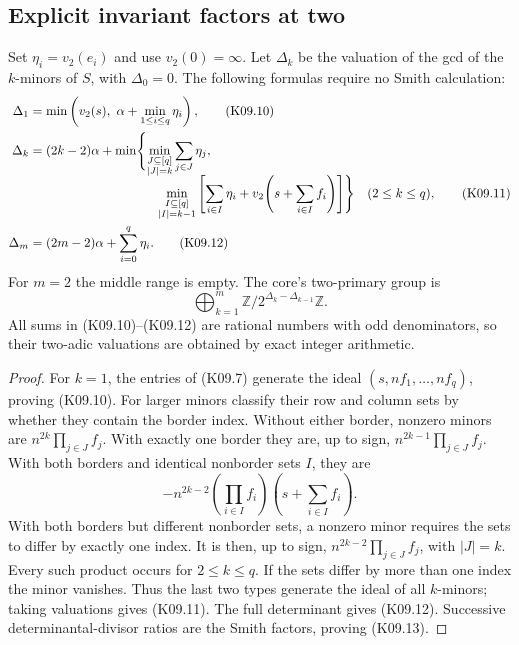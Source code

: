 \documentclass[11pt,a4paper]{article}
\theoremstyle{definition}\newtheorem{definition}[theorem]{Definition}
\theoremstyle{remark}\newtheorem{remark}[theorem]{Remark}
\newcommand{\Z}{\mathbb Z}\newcommand{\Q}{\mathbb Q}\newcommand{\F}{\mathbb F}
\numberwithin{equation}{section}
\begin{document}
\subsection{Explicit invariant factors at two}\label{K09-sec-4}
Set $\eta_i=v_2(e_i)$ and use $v_2(0)=\infty$. Let $\Delta_k$ be the valuation of the gcd of the $k$-minors of $S$, with $\Delta_0=0$. The following formulas require no Smith calculation:
\begin{align*}
 \Delta_1&=\min\left(v_2(s),\ \alpha+\min_{1\leq i\leq q}\eta_i\right),               \tag{K09.10}\\
 \Delta_k&=(2k-2)\alpha+\min\Biggl\{
 \min_{\substack{J\subseteq[q]\\|J|=k}}\sum_{j\in J}\eta_j,\\[-2mm]
 &\hspace{35mm}\min_{\substack{I\subseteq[q]\\|I|=k-1}}
 \left[\sum_{i\in I}\eta_i+v_2\!\left(s+\sum_{i\in I}f_i\right)\right]
 \Biggr\}\quad(2\leq k\leq q),                              \tag{K09.11}\\
 \Delta_m&=(2m-2)\alpha+\sum_{i=0}^q\eta_i.                 \tag{K09.12}
\end{align*}
For $m=2$ the middle range is empty. The core's two-primary group is
\[
 \bigoplus_{k=1}^m\Z/2^{\Delta_k-\Delta_{k-1}}\Z.            \tag{K09.13}
\]
All sums in (K09.10)--(K09.12) are rational numbers with odd denominators, so their two-adic valuations are obtained by exact integer arithmetic.

\begin{proof}
For $k=1$, the entries of (K09.7) generate the ideal $(s,nf_1,\ldots,nf_q)$, proving (K09.10). For larger minors classify their row and column sets by whether they contain the border index. Without either border, nonzero minors are $n^{2k}\prod_{j\in J}f_j$. With exactly one border they are, up to sign, $n^{2k-1}\prod_{j\in J}f_j$. With both borders and identical nonborder sets $I$, they are
\[
 -n^{2k-2}\left(\prod_{i\in I}f_i\right)
               \left(s+\sum_{i\in I}f_i\right).
\]
With both borders but different nonborder sets, a nonzero minor requires the sets to differ by exactly one index. It is then, up to sign, $n^{2k-2}\prod_{j\in J}f_j$, with $|J|=k$. Every such product occurs for $2\leq k\leq q$. If the sets differ by more than one index the minor vanishes. Thus the last two types generate the ideal of all $k$-minors; taking valuations gives (K09.11). The full determinant gives (K09.12). Successive determinantal-divisor ratios are the Smith factors, proving (K09.13).
\end{proof}
\end{document}
